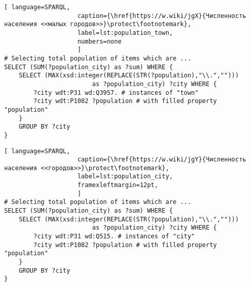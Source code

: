 \newpage
{}
\begin{lstlisting}[ language=SPARQL, 
                    caption={\href{https://w.wiki/jgX}{Численность населения <<малых городов>>}\protect\footnotemark},
                    label=lst:population_town,
                    numbers=none
                    ]
# Selecting total population of items which are ...
SELECT (SUM(?population_city) as ?sum) WHERE {                    
	SELECT (MAX(xsd:integer(REPLACE(STR(?population),"\\.",""))) 
						as ?population_city) ?city WHERE {
		?city wdt:P31 wd:Q3957.	# instances of "town"
		?city wdt:P1082 ?population # with filled property "population"                                  
	}
	GROUP BY ?city
}
\end{lstlisting}


\begin{lstlisting}[ language=SPARQL, 
                    caption={\href{https://w.wiki/jgY}{Численность населения <<городов>>}\protect\footnotemark},
                    label=lst:population_city,
                    framexleftmargin=12pt,
                    ]
# Selecting total population of items which are ...
SELECT (SUM(?population_city) as ?sum) WHERE {                    
	SELECT (MAX(xsd:integer(REPLACE(STR(?population),"\\.",""))) 
						as ?population_city) ?city WHERE {
		?city wdt:P31 wd:Q515. # instances of "city"
		?city wdt:P1082 ?population # with filled property "population"
	}
	GROUP BY ?city
}\end{lstlisting}

